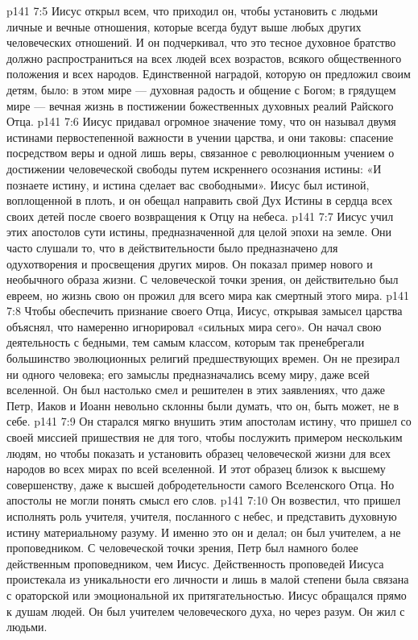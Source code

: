 \vs p141 7:5 Иисус открыл всем, что приходил он, чтобы установить с людьми личные и вечные отношения, которые всегда будут выше любых других человеческих отношений. И он подчеркивал, что это тесное духовное братство должно распространиться на всех людей всех возрастов, всякого общественного положения и всех народов. Единственной наградой, которую он предложил своим детям, было: в этом мире --- духовная радость и общение с Богом; в грядущем мире --- вечная жизнь в постижении божественных духовных реалий Райского Отца.
\vs p141 7:6 Иисус придавал огромное значение тому, что он называл двумя истинами первостепенной важности в учении царства, и они таковы: спасение посредством веры и одной лишь веры, связанное с революционным учением о достижении человеческой свободы путем искреннего осознания истины: «И познаете истину, и истина сделает вас свободными». Иисус был истиной, воплощенной в плоть, и он обещал направить свой Дух Истины в сердца всех своих детей после своего возвращения к Отцу на небеса.
\vs p141 7:7 Иисус учил этих апостолов сути истины, предназначенной для целой эпохи на земле. Они часто слушали то, что в действительности было предназначено для одухотворения и просвещения других миров. Он показал пример нового и необычного образа жизни. С человеческой точки зрения, он действительно был евреем, но жизнь свою он прожил для всего мира как смертный этого мира.
\vs p141 7:8 Чтобы обеспечить признание своего Отца, Иисус, открывая замысел царства объяснял, что намеренно игнорировал «сильных мира сего». Он начал свою деятельность с бедными, тем самым классом, которым так пренебрегали большинство эволюционных религий предшествующих времен. Он не презирал ни одного человека; его замыслы предназначались всему миру, даже всей вселенной. Он был настолько смел и решителен в этих заявлениях, что даже Петр, Иаков и Иоанн невольно склонны были думать, что он, быть может, не в себе.
\vs p141 7:9 Он старался мягко внушить этим апостолам истину, что пришел со своей миссией пришествия не для того, чтобы послужить примером нескольким людям, но чтобы показать и установить образец человеческой жизни для всех народов во всех мирах по всей вселенной. И этот образец близок к высшему совершенству, даже к высшей добродетельности самого Вселенского Отца. Но апостолы не могли понять смысл его слов.
\vs p141 7:10 Он возвестил, что пришел исполнять роль учителя, учителя, посланного с небес, и представить духовную истину материальному разуму. И именно это он и делал; он был учителем, а не проповедником. С человеческой точки зрения, Петр был намного более действенным проповедником, чем Иисус. Действенность проповедей Иисуса проистекала из уникальности его личности и лишь в малой степени была связана с ораторской или эмоциональной их притягательностью. Иисус обращался прямо к душам людей. Он был учителем человеческого духа, но через разум. Он жил с людьми.

